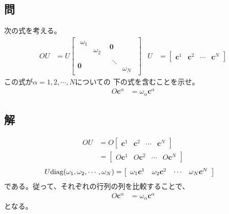 
\subsection{問}
次の式を考える。
\begin{align}
	OU
&=
	U
		\left[
		\begin{array}{cc}
				\begin{array}{cc}
					\omega_1 &  \\
					 & \omega_2
				\end{array}
				&
				\bm{0} \\
				\bm{0}
				&
				\begin{array}{cc}
					\ddots &    \\
					 & \omega_N
				\end{array}
		\end{array}
		\right] &
%
%
	U
&=
	\left[
	\begin{array}{cccc}
		\bm{c}^1 & \bm{c}^2 & \cdots & \bm{c}^N
	\end{array}
	\right]
\end{align}
この式が$\alpha=1,2,\cdots,N$についての
下の式を含むことを示せ。
\begin{align}
	O \bm{c}^{\alpha}
&=
	\omega_{\alpha} \bm{c}^{\alpha}
\end{align}


\subsection{解}
\begin{align}
	OU
&=
	O
		\left[
		\begin{array}{cccc}
			\bm{c}^1 & \bm{c}^2 & \cdots & \bm{c}^N
		\end{array}
		\right] \\
%
%
&=
	\left[
	\begin{array}{cccc}
		O\bm{c}^1 & O\bm{c}^2 & \cdots & O\bm{c}^N
	\end{array}
	\right]
\end{align}
\begin{align}
	U {\rm diag}(\omega_1,\omega_2,\cdots,\omega_N)
&=
	\left[
	\begin{array}{cccc}
		\omega_1\bm{c}^1 & \omega_2\bm{c}^2 & \cdots & \omega_N\bm{c}^N
	\end{array}
	\right]
\end{align}
である。従って、それぞれの行列の列を比較することで、
\begin{align}
	O\bm{c}^{\alpha}
&=
	\omega_{\alpha}\bm{c}^{\alpha}
\end{align}
となる。
